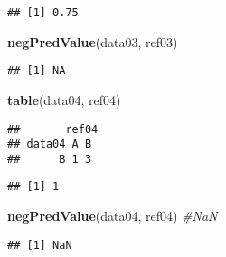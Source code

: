 \documentclass[]{article}
\newenvironment{Shaded}{\begin{snugshade}}{\end{snugshade}}
\newcommand{\CommentTok}[1]{\textcolor[rgb]{0.56,0.35,0.01}{\textit{#1}}}
\newcommand{\KeywordTok}[1]{\textcolor[rgb]{0.13,0.29,0.53}{\textbf{#1}}}
\newcommand{\NormalTok}[1]{#1}
\begin{document}
\begin{verbatim}
## [1] 0.75
\end{verbatim}

\begin{Shaded}
\begin{Highlighting}[]
\KeywordTok{negPredValue}\NormalTok{(data03, ref03) }
\end{Highlighting}
\end{Shaded}

\begin{verbatim}
## [1] NA
\end{verbatim}

\begin{Shaded}
\begin{Highlighting}[]
\KeywordTok{table}\NormalTok{(data04, ref04)}
\end{Highlighting}
\end{Shaded}

\begin{verbatim}
##       ref04
## data04 A B
##      B 1 3
\end{verbatim}

\begin{Shaded}
\end{Shaded}

\begin{verbatim}
## [1] 1
\end{verbatim}

\begin{Shaded}
\begin{Highlighting}[]
\KeywordTok{negPredValue}\NormalTok{(data04, ref04) }\CommentTok{#NaN}
\end{Highlighting}
\end{Shaded}

\begin{verbatim}
## [1] NaN
\end{verbatim}
\end{document}
